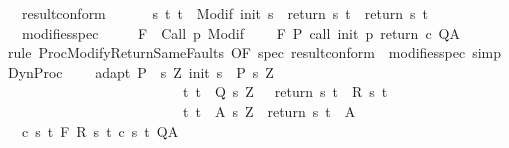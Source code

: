 \begin{isabellebody}
\ \ \ result{\isacharunderscore}conform{\isacharcolon}\isanewline
\ \ \ \ \ \ {\isachardoublequoteopen}{\isasymforall}s\ t{\isachardot}\ t\ {\isasymin}\ Modif\ {\isacharparenleft}init\ s{\isacharparenright}\ {\isasymlongrightarrow}\ {\isacharparenleft}return{\isacharprime}\ s\ t{\isacharparenright}\ {\isacharequal}\ {\isacharparenleft}return\ s\ t{\isacharparenright}{\isachardoublequoteclose}\isanewline
\ \ \ modifies{\isacharunderscore}spec{\isacharcolon}\ \ \isanewline
\ \ {\isachardoublequoteopen}{\isasymforall}{\isasymsigma}{\isachardot}\ {\isasymGamma}{\isacharcomma}{\isasymTheta}{\isasymturnstile}\isactrlbsub {\isacharslash}F\isactrlesub \ {\isacharbraceleft}{\isasymsigma}{\isacharbraceright}\ Call\ p\ {\isacharparenleft}Modif\ {\isasymsigma}{\isacharparenright}{\isacharcomma}{\isacharbraceleft}{\isacharbraceright}{\isachardoublequoteclose}\isanewline
\ \ \ {\isachardoublequoteopen}{\isasymGamma}{\isacharcomma}{\isasymTheta}{\isasymturnstile}\isactrlbsub {\isacharslash}F\isactrlesub \ P\ {\isacharparenleft}call\ init\ p\ return\ c{\isacharparenright}\ Q{\isacharcomma}A{\isachardoublequoteclose}\isanewline
%
\isadelimproof
%
\endisadelimproof
%
\isatagproof
{}\isamarkupfalse%
\ {\isacharparenleft}rule\ ProcModifyReturnSameFaults\ {\isacharbrackleft}OF\ spec\ result{\isacharunderscore}conform\ {\isacharunderscore}\ modifies{\isacharunderscore}spec{\isacharbrackright}{\isacharparenright}\ simp%
\endisatagproof
{\isafoldproof}%
%
\isadelimproof
\isanewline
%
\endisadelimproof
\isanewline
\isanewline
{}\isamarkupfalse%
\ DynProc{\isacharcolon}\ \isanewline
\ \ \ adapt{\isacharcolon}\ {\isachardoublequoteopen}P\ {\isasymsubseteq}\ {\isacharbraceleft}s{\isachardot}\ {\isasymexists}Z{\isachardot}\ init\ s\ {\isasymin}\ P{\isacharprime}\ s\ Z\ {\isasymand}\isanewline
\ \ \ \ \ \ \ \ \ \ \ \ \ \ \ \ \ \ \ \ \ \ \ \ \ \ {\isacharparenleft}{\isasymforall}t{\isachardot}\ t\ {\isasymin}\ Q{\isacharprime}\ s\ Z\ {\isasymlongrightarrow}\ \ return\ s\ t\ {\isasymin}\ R\ s\ t{\isacharparenright}\ {\isasymand}\isanewline
\ \ \ \ \ \ \ \ \ \ \ \ \ \ \ \ \ \ \ \ \ \ \ \ \ \ {\isacharparenleft}{\isasymforall}t{\isachardot}\ t\ {\isasymin}\ A{\isacharprime}\ s\ Z\ {\isasymlongrightarrow}\ return\ s\ t\ {\isasymin}\ A{\isacharparenright}{\isacharbraceright}{\isachardoublequoteclose}\isanewline
\ \ \ c{\isacharcolon}\ {\isachardoublequoteopen}{\isasymforall}s\ t{\isachardot}\ {\isasymGamma}{\isacharcomma}{\isasymTheta}{\isasymturnstile}\isactrlbsub {\isacharslash}F\isactrlesub \ {\isacharparenleft}R\ s\ t{\isacharparenright}\ {\isacharparenleft}c\ s\ t{\isacharparenright}\ Q{\isacharcomma}A{\isachardoublequoteclose}\isanewline

\end{isabellebody}
